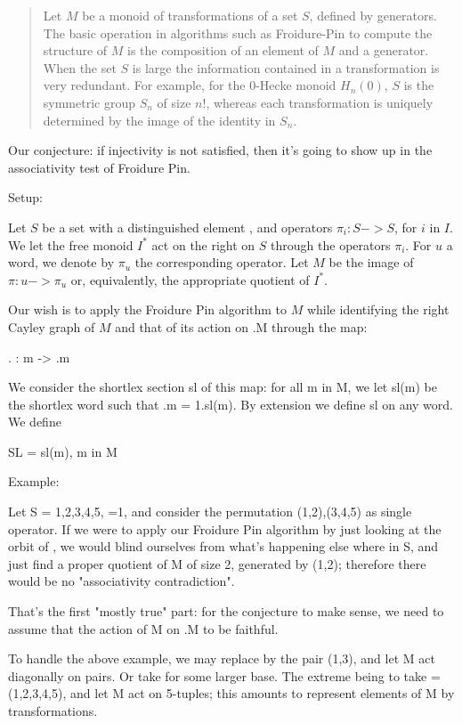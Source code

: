 \documentclass[12pt]{amsart}
\newcommand{\p}{\mathbb{1}} %
\begin{document}
\begin{abstract}
  Let $M$ be a monoid of transformations of a set $S$, defined by
  generators. The basic operation in algorithms such as Froidure-Pin
  to compute the structure of $M$ is the composition of an element of
  $M$ and a generator. When the set $S$ is large the information
  contained in a transformation is very redundant. For example, for
  the $0$-Hecke monoid $H_n(0)$, $S$ is the symmetric group $S_n$ of
  size $n!$, whereas each transformation is uniquely determined by the
  image of the identity in $S_n$.
\end{abstract}

Our conjecture: if injectivity is not satisfied, then it's going to
show up in the associativity test of Froidure Pin.


Setup:

    Let $S$ be a set with a distinguished element \p, and operators $\pi_i: S -> S$, for $i$ in $I$. We let
    the free monoid $I^*$ act on the right on $S$ through the operators
    $\pi_i$. For $u$ a word, we denote by $\pi_u$ the corresponding operator.
    Let $M$ be the image of $\pi: u-> \pi_u$ or, equivalently, the
    appropriate quotient of $I^*$.

    Our wish is to apply the Froidure Pin algorithm to $M$ while
    identifying the right Cayley graph of $M$ and that of its action on
    \p.M through the map:

        \p.  :   m  ->  \p.m

    We consider the shortlex section sl of this map: for all m in M,
    we let sl(m) be the shortlex word such that \p.m = 1.sl(m). By
    extension we define sl on any word. We define

        SL = { sl(m),  m in M }

Example:

    Let S = {1,2,3,4,5}, \p =1, and consider the permutation
    (1,2),(3,4,5) as single operator. If we were to apply our Froidure
    Pin algorithm by just looking at the orbit of \p, we would blind
    ourselves from what's happening else where in S, and just find a
    proper quotient of M of size 2, generated by (1,2); therefore
    there would be no "associativity contradiction".

That's the first "mostly true" part: for the conjecture to make sense,
we need to assume that the action of M on \p.M to be faithful.

To handle the above example, we may replace \p by the pair (1,3), and
let M act diagonally on pairs. Or take for \p some larger base. The
extreme being to take \p = (1,2,3,4,5), and let M act on 5-tuples;
this amounts to represent elements of M by transformations.
\end{document}
